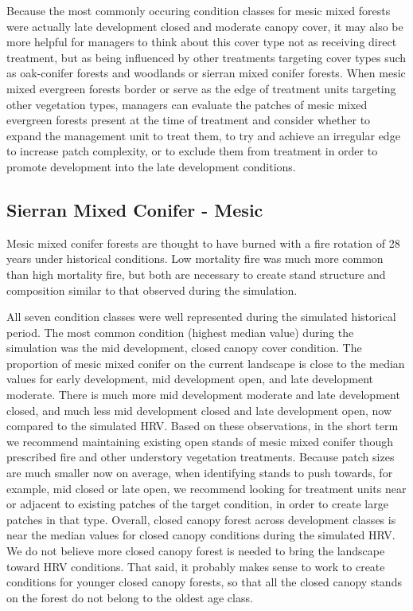 Because the most commonly occuring condition classes for mesic mixed forests were actually late development closed and moderate canopy cover, it may also be more helpful for managers to think about this cover type not as receiving direct treatment, but as being influenced by other treatments targeting cover types such as oak-conifer forests and woodlands or sierran mixed conifer forests. When mesic mixed evergreen forests border or serve as the edge of treatment units targeting other vegetation types, managers can evaluate the patches of mesic mixed evergreen forests present at the time of treatment and consider whether to expand the management unit to treat them, to try and achieve an irregular edge to increase patch complexity, or to exclude them from treatment in order to promote development into the late development conditions.                                                                                                                                                                                                                                                                                                                                                                                                                                                    
\subsection{Sierran Mixed Conifer - Mesic}
Mesic mixed conifer forests are thought to have burned with a fire rotation of 28 years under historical conditions. Low mortality fire was much more common than high mortality fire, but both are necessary to create stand structure and composition similar to that observed during the simulation. 

All seven condition classes were well represented during the simulated historical period. The most common condition (highest median value) during the simulation was the mid development, closed canopy cover condition. The proportion of mesic mixed conifer on the current landscape is close to the median values for early development, mid development open, and late development moderate. There is much more mid development moderate and late development closed, and much less mid development closed and late development open, now compared to the simulated HRV. Based on these observations, in the short term we recommend maintaining existing open stands of mesic mixed conifer though prescribed fire and other understory vegetation treatments. Because patch sizes are much smaller now on average, when identifying stands to push towards, for example, mid closed or late open, we recommend looking for treatment units near or adjacent to existing patches of the target condition, in order to create large patches in that type. Overall, closed canopy forest across development classes is near the median values for closed canopy conditions during the simulated HRV. We do not believe more closed canopy forest is needed to bring the landscape toward HRV conditions. That said, it probably makes sense to work to create conditions for younger closed canopy forests, so that all the closed canopy stands on the forest do not belong to the oldest age class.


